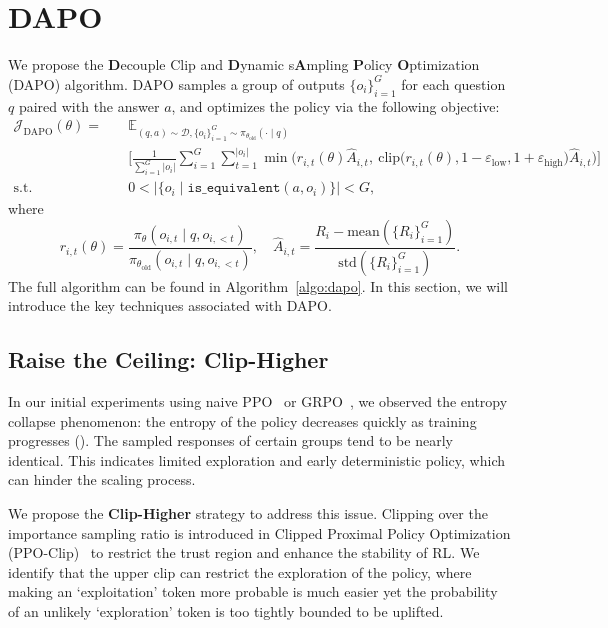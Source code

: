 \section{DAPO}
\label{sec:method}

We propose the \textbf{D}ecouple Clip and \textbf{D}ynamic s\textbf{A}mpling \textbf{P}olicy \textbf{O}ptimization (DAPO) algorithm. DAPO samples a group of outputs $\{o_i\}_{i=1}^G$ for each question $q$ paired with the answer $a$, and optimizes the policy via the following objective:
\begin{equation}
\begin{aligned}
\mathcal{J}_{\text{DAPO}}(\theta) =\quad& \mathbb{E}_{(q,a)\sim \mathcal{D}, \{o_i\}_{i=1}^G\sim \pi_{\theta_\text{old}}(\cdot\mid q)}\\&
\Bigg[\frac{1}{\sum_{i=1}^{G}|o_i|}\sum_{i=1}^{G}\sum_{t=1}^{|o_i|} 
\min \Big( r_{i,t}(\theta) \hat{A}_{i,t},  
\ \text{clip} \Big( r_{i,t}(\theta), 1 - {\varepsilon_{\text{low}}}, 1 + {\varepsilon_{\text{high}}} \Big) \hat{A}_{i,t} \Big) \Bigg]
\\
\text{s.t.}\quad& 0< \Big|\{o_i\mid\texttt{is\_equivalent}(a,o_i)\}\Big|< G,
\label{eq:dapoloss}
\end{aligned}
\end{equation}
where
\begin{equation}
    r_{i,t}(\theta)=\frac{\pi_{\theta}(o_{i,t} \mid q, o_{i,<t})}{\pi_{\theta_{\text{old}}}(o_{i,t} \mid q,o_{i,<t})},\quad\hat{A}_{i,t} = \frac{R_i - \text{mean}(\{R_i\}_{i=1}^G)}{\text{std}(\{R_i\}_{i=1}^G)}.
\label{eq:advantage_calculation}
\end{equation}
The full algorithm can be found in Algorithm~\ref{algo:dapo}. In this section, we will introduce the key techniques associated with DAPO.

\subsection{Raise the Ceiling: Clip-Higher}
\label{sec:cliphigher}

In our initial experiments using naive PPO~\cite{schulman2017proximal} or GRPO~\cite{deepseekmath}, we observed the entropy collapse phenomenon: the entropy of the policy decreases quickly as training progresses (). The sampled responses of certain groups tend to be nearly identical. This indicates limited exploration and early deterministic policy, which can hinder the scaling process. 

We propose the \textbf{Clip-Higher} strategy to address this issue. Clipping over the importance sampling ratio is introduced in Clipped Proximal Policy Optimization (PPO-Clip)~\cite{schulman2017proximal} to restrict the trust region and enhance the stability of RL. 
We identify that the upper clip can restrict the exploration of the policy, where making an `exploitation' token more probable is much easier yet the probability of an unlikely `exploration' token is too tightly bounded to be uplifted.

